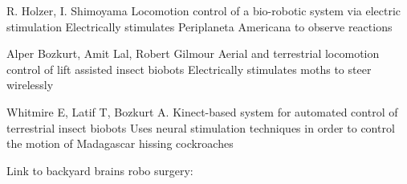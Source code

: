 R. Holzer, I. Shimoyama
Locomotion control of a bio-robotic system via electric stimulation
Electrically stimulates Periplaneta Americana to observe reactions

Alper Bozkurt, Amit Lal, Robert Gilmour
Aerial and terrestrial locomotion control of lift assisted insect biobots
Electrically stimulates moths to steer wirelessly

Whitmire E, Latif T, Bozkurt A.
Kinect-based system for automated control of terrestrial insect biobots
Uses neural stimulation techniques in order to control the motion of Madagascar hissing cockroaches

Link to backyard brains robo surgery: %

